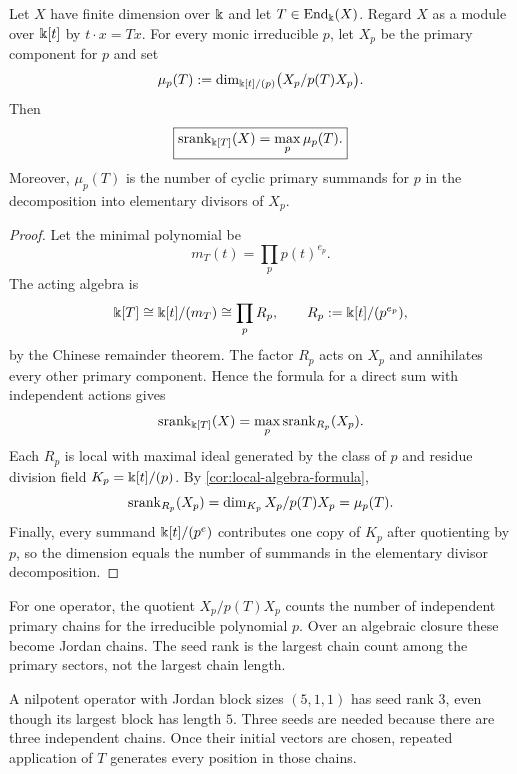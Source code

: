 \begin{theorem}
\label{thm:single-operator}
Let $X$ have finite dimension over $\Bbbk$ and let $T\in\operatorname{End}_{\Bbbk}(X)$.  Regard $X$ as a module over $\Bbbk[t]$ by $t\cdot x=Tx$.  For every monic irreducible $p$, let $X_p$ be the primary component for $p$ and set
\[
\mu_p(T):=
\dim_{\Bbbk[t]/(p)}\bigl(X_p/p(T)X_p\bigr).
\]
Then
\[
\boxed{
\operatorname{srank}_{\Bbbk[T]}(X)=\max_p\mu_p(T).
}
\]
Moreover, $\mu_p(T)$ is the number of cyclic primary summands for $p$ in the decomposition into elementary divisors of $X_p$.
\end{theorem}

\begin{proof}
Let the minimal polynomial be
\[
m_T(t)=\prod_{p}p(t)^{e_p}.
\]
The acting algebra is
\[
\Bbbk[T]\cong\Bbbk[t]/(m_T)
\cong\prod_pR_p,
\qquad
R_p:=\Bbbk[t]/(p^{e_p}),
\]
by the Chinese remainder theorem.  The factor $R_p$ acts on $X_p$ and annihilates every other primary component.  Hence the formula for a direct sum with independent actions gives
\[
\operatorname{srank}_{\Bbbk[T]}(X)=\max_p\operatorname{srank}_{R_p}(X_p).
\]
Each $R_p$ is local with maximal ideal generated by the class of $p$ and residue division field $K_p=\Bbbk[t]/(p)$.  By \cref{cor:local-algebra-formula},
\[
\operatorname{srank}_{R_p}(X_p)
=
\dim_{K_p}X_p/p(T)X_p
=
\mu_p(T).
\]
Finally, every summand $\Bbbk[t]/(p^e)$ contributes one copy of $K_p$ after quotienting by $p$, so the dimension equals the number of summands in the elementary divisor decomposition.
\end{proof}

\begin{interpretation}
For one operator, the quotient \(X_p/p(T)X_p\) counts the number of independent primary chains for the irreducible polynomial \(p\).  Over an algebraic closure these become Jordan chains.  The seed rank is the largest chain count among the primary sectors, not the largest chain length.
\end{interpretation}

\begin{microexample}[title={Block count versus block size}]
A nilpotent operator with Jordan block sizes \((5,1,1)\) has seed rank \(3\), even though its largest block has length \(5\).  Three seeds are needed because there are three independent chains.  Once their initial vectors are chosen, repeated application of \(T\) generates every position in those chains.
\end{microexample}


